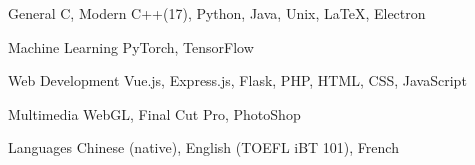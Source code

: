 

\begin{cvskills}

  \cvskill
    {General} %
    {C, Modern C++(17), Python, Java, Unix, LaTeX, Electron} %

  \cvskill
    {Machine Learning} %
    {PyTorch, TensorFlow} %

  \cvskill
    {Web Development} %
    {Vue.js, Express.js, Flask, PHP, HTML, CSS, JavaScript} %

  \cvskill
    {Multimedia} %
    {WebGL, Final Cut Pro, PhotoShop} %

  \cvskill
    {Languages} %
    {Chinese (native), English (TOEFL iBT 101), French} %

\end{cvskills}
